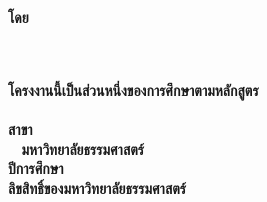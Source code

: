 \pagestyle{empty}
\begin{center}
	\vspace*{40mm}
	\begin{spacing}{1.4}
		\textbf{\huge\titleThai}
	\end{spacing}
	\vspace*{35mm}
	\textbf{โดย}\\
	\vspace*{10mm}
	\textbf{\authorAThaiNew}\\
	\textbf{\authorBThaiNew}\\
	\vfill
	\begin{spacing}{1.3}
		\textbf{โครงงานนี้เป็นส่วนหนึ่งของการศึกษาตามหลักสูตร\\
			\degreeThai \\ สาขา\majorThai\\
			\facultyThai ~ มหาวิทยาลัยธรรมศาสตร์  \\
			ปีการศึกษา \academicYearThai\\ ลิขสิทธิ์ของมหาวิทยาลัยธรรมศาสตร์}
	\end{spacing}
\end{center}
